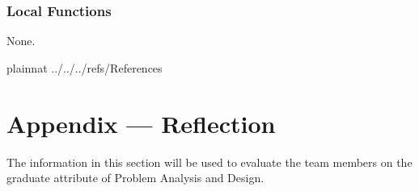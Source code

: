 \documentclass[12pt, titlepage]{article}
\begin{document}
\subsubsection{Local Functions}

None.

\newpage

 {plainnat}
 {../../../refs/References}


\newpage{}

\section*{Appendix --- Reflection}


The information in this section will be used to evaluate the team members on the
graduate attribute of Problem Analysis and Design.


\end{document}

